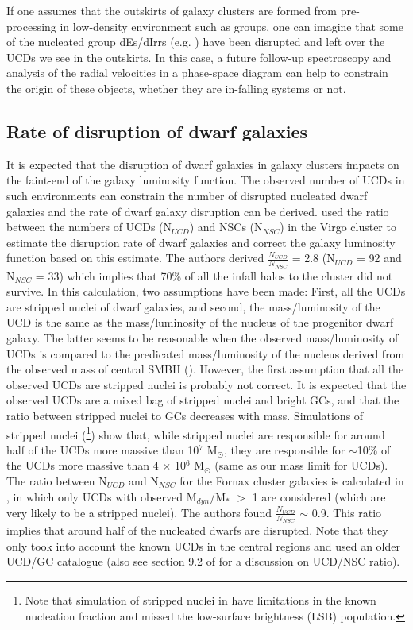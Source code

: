 \documentclass[fleqn,usenatbib]{mnras}
\begin{document}
If one assumes that the outskirts of galaxy clusters are formed from pre-processing in low-density environment such as groups, one can imagine that some of the nucleated group dEs/dIrrs (e.g. \citealp{Georgiev}) have been disrupted and left over the UCDs we see in the outskirts. In this case, a future follow-up spectroscopy and analysis of the radial velocities in a phase-space diagram can help to constrain the origin of these objects, whether they are in-falling systems or not.

\subsection{Rate of disruption of dwarf galaxies}

It is expected that the disruption of dwarf galaxies in galaxy clusters impacts on the faint-end of the galaxy luminosity function. The observed number of UCDs in such environments can constrain the number of disrupted nucleated dwarf galaxies and the rate of dwarf galaxy disruption can be derived. \citet{Ferrarese} used the ratio between the numbers of UCDs (N$_{UCD}$) and NSCs (N$_{NSC}$) in the Virgo cluster to estimate the disruption rate of dwarf galaxies and correct the galaxy luminosity function based on this estimate. The authors derived $\frac{N_{UCD}}{N_{NSC}}$ = 2.8 (N$_{UCD}$ = 92 and N$_{NSC}$ = 33) which implies that 70\% of all the infall halos to the cluster did not survive. In this calculation, two assumptions have been made: First, all the UCDs are stripped nuclei of dwarf galaxies, and second, the mass/luminosity of the UCD is the same as the mass/luminosity of the nucleus of the progenitor dwarf galaxy. The latter seems to be reasonable when the observed mass/luminosity of UCDs is compared to the predicated mass/luminosity of the nucleus derived from the observed mass of central SMBH (\citealp{alister}). However, the first assumption that all the observed UCDs are stripped nuclei is probably not correct. It is expected that the observed UCDs are a mixed bag of stripped nuclei and bright GCs, and that the ratio between stripped nuclei to GCs decreases with mass. Simulations of stripped nuclei (\citealp{Pfeffer2014,Pfeffer-2016}\footnote{Note that simulation of stripped nuclei in \citet{Pfeffer2014,Pfeffer-2016} have limitations in the known nucleation fraction and missed the low-surface brightness (LSB) population.}) show that, while stripped nuclei are responsible for around half of the UCDs more massive than 10$^7$ M$_{\odot}$, they are responsible for $\sim$10\% of the UCDs more massive than 4 $\times$ 10$^6$ M$_{\odot}$ (same as our mass limit for UCDs). The ratio between N$_{UCD}$ and N$_{NSC}$ for the Fornax cluster galaxies is calculated in \citet{voggel2019}, in which only UCDs with observed M$_{dyn}$/M$_*$ $>$ 1 are considered (which are very likely to be a stripped nuclei). The authors found $\frac{N_{UCD}}{N_{NSC}}$ $\sim$ 0.9. This ratio implies that around half of the nucleated dwarfs are disrupted. Note that they only took into account the known UCDs in the central regions and used an older UCD/GC catalogue (also see section 9.2 of \citet{nscreview} for a discussion on UCD/NSC ratio).
\end{document}
